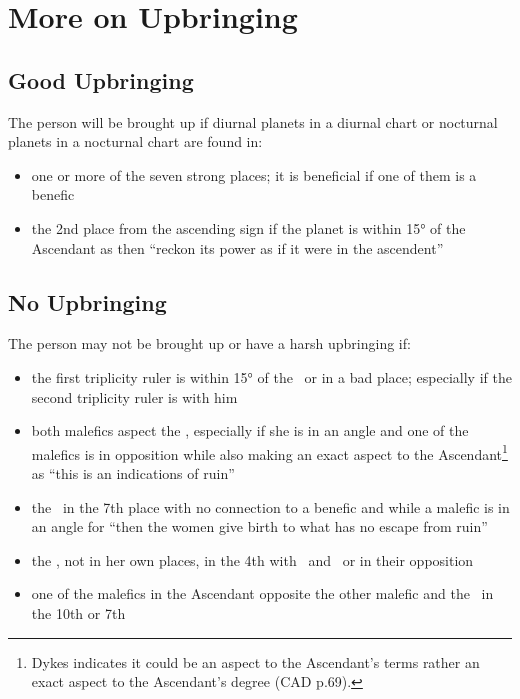 \section{More on Upbringing}

\subsection{Good Upbringing}
The person will be brought up if diurnal planets in a diurnal chart or nocturnal planets in a nocturnal chart are found in:
\begin{itemize}[topsep=0pt,itemsep=0pt]
\item one or more of the seven strong places; it is beneficial if one of them is a benefic

\item the 2nd place from the ascending sign if the planet is within 15° of the Ascendant as then ``reckon its power as if it were in the ascendent''
\end{itemize}

\subsection{No Upbringing}
The person may not be brought up or have a harsh upbringing if:
\begin{itemize}[topsep=0pt,itemsep=0pt]
\item the first triplicity ruler is within 15° of the \Sun\, or in a bad place; especially if the second triplicity ruler is with him

\item both malefics aspect the \Moon, especially if she is in an angle and one of the malefics is in opposition while also making an exact aspect to the Ascendant\footnote{Dykes indicates it could be an aspect to the Ascendant's terms rather an exact aspect to the Ascendant's degree (CAD p.69).} as ``this is an indications of ruin''

\item the \Moon\, in the 7th place with no connection to a benefic and while a malefic is in an angle for ``then the women give birth to what has no escape from ruin''

\item the \Moon, not in her own places, in the 4th with \Saturn\, and \Mars\, or in their opposition

\item one of the malefics in the Ascendant opposite the other malefic and the \Moon\, in the 10th or 7th

\end{itemize}

